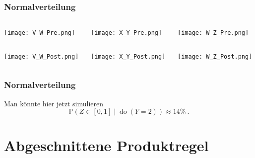 \documentclass{beamer}
\newcommand{\Do}{\operatorname{do}}
\begin{document}
\begin{frame}
\frametitle{Normalverteilung}

\begin{columns}
\begin{column}{0.33\linewidth}
\begin{center}
	\texttt{[image: V\_W\_Pre.png]}
\end{center}
\end{column}
\begin{column}{0.33\linewidth}
\begin{center}
	\texttt{[image: X\_Y\_Pre.png]}
\end{center}
\end{column}
\begin{column}{0.33\linewidth}
\begin{center}
	\texttt{[image: W\_Z\_Pre.png]}
\end{center}
\end{column}
\end{columns}

\begin{columns}
\begin{column}{0.33\linewidth}
\begin{center}
	\texttt{[image: V\_W\_Post.png]}
\end{center}
\end{column}
\begin{column}{0.33\linewidth}
\begin{center}
	\texttt{[image: X\_Y\_Post.png]}
\end{center}
\end{column}
\begin{column}{0.33\linewidth}
\begin{center}
	\texttt{[image: W\_Z\_Post.png]}
\end{center}
\end{column}
\end{columns}
\end{frame}

\begin{frame}
\frametitle{Normalverteilung}

Man könnte hier jetzt simulieren
\[\mathbb{P}(Z \in [0, 1] \mid \Do(Y = 2)) \approx 14 \%~.\]
\end{frame}

\section{Abgeschnittene Produktregel}
\end{document}
